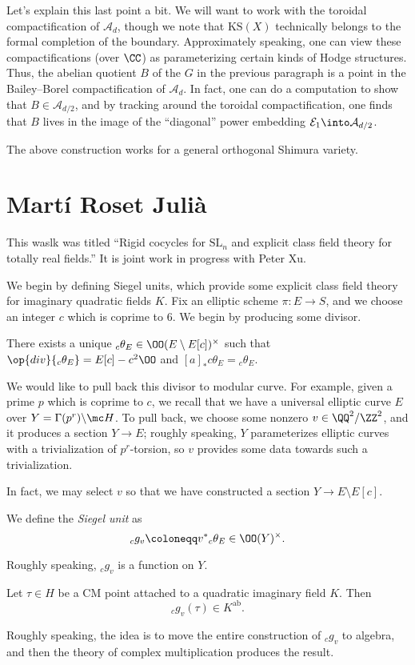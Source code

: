 \documentclass{article}
\begin{document}
Let's explain this last point a bit. We will want to work with the toroidal compactification of $\mathcal A_d$, though we note that $\mathrm{KS}(X)$ technically belongs to the formal completion of the boundary. Approximately speaking, one can view these compactifications (over $\CC$) as parameterizing certain kinds of Hodge structures. Thus, the abelian quotient $B$ of the $G$ in the previous paragraph is a point in the Bailey--Borel compactification of $\mathcal A_d$. In fact, one can do a computation to show that $B\in\mathcal A_{d/2}$, and by tracking around the toroidal compactification, one finds that $B$ lives in the image of the ``diagonal'' power embedding $\mathcal E_1\into\mathcal A_{d/2}$.
\begin{remark}
	The above construction works for a general orthogonal Shimura variety.
\end{remark}

\section{Mart\'i Roset Juli\`a}
This waslk was titled ``Rigid cocycles for $\mathrm{SL}_n$ and explicit class field theory for totally real fields.'' It is joint work in progress with Peter Xu.

We begin by defining Siegel units, which provide some explicit class field theory for imaginary quadratic fields $K$. Fix an elliptic scheme $\pi\colon E\to S$, and we choose an integer $c$ which is coprime to $6$. We begin by producing some divisor.
\begin{proposition}
	There exists a unique $_c\theta_E\in\OO(E\setminus E[c])^\times$ such that $\op{div}{_c\theta_E}=E[c]-c^2\OO$ and $[a]_*c\theta_E={_c\theta_E}$.
\end{proposition}
We would like to pull back this divisor to modular curve. For example, given a prime $p$ which is coprime to $c$, we recall that we have a universal elliptic curve $E$ over $Y=\Gamma(p^r)\backslash\mc H$. To pull back, we choose some nonzero $v\in\QQ^2/\ZZ^2$, and it produces a section $Y\to E$; roughly speaking, $Y$ parameterizes elliptic curves with a trivialization of $p^r$-torsion, so $v$ provides some data towards such a trivialization.

In fact, we may select $v$ so that we have constructed a section $Y\to E\setminus E[c]$.
\begin{definition}
	We define the \textit{Siegel unit} as
	\[_cg_v\coloneqq v^*{_c\theta_E}\in\OO(Y)^\times.\]
\end{definition}
Roughly speaking, $_cg_v$ is a function on $Y$.
\begin{theorem}
	Let $\tau\in H$ be a CM point attached to a quadratic imaginary field $K$. Then
	\[_cg_v(\tau)\in K^{\mathrm{ab}}.\]
\end{theorem}
Roughly speaking, the idea is to move the entire construction of $_cg_v$ to algebra, and then the theory of complex multiplication produces the result.
\end{document}
